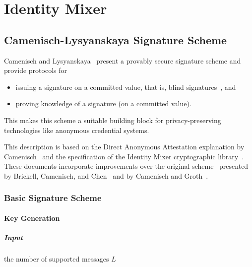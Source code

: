\chapter{Identity Mixer}

\section{Camenisch-Lysyanskaya Signature Scheme}

Camenisch and Lysyanskaya~\cite{CamenischLysyanskaya2002,Lysyanskaya2002}
present a provably secure signature scheme and provide protocols for
\begin{itemize}
  \item issuing a signature on a committed value, that is, blind
    signatures~\cite{Chaum1983}, and
  \item proving knowledge of a signature (on a committed value).
\end{itemize}
This makes this scheme a suitable building block for privacy-preserving
technologies like anonymous credential systems.

This description is based on the Direct Anonymous Attestation explanation by
Camenisch~\cite{Camenisch2007} and the specification of the Identity Mixer
cryptographic library~\cite{Idemix_Crypto2010}. These documents incorporate
improvements over the original scheme~\cite{CamenischLysyanskaya2002} presented
by Brickell, Camenisch, and Chen~\cite{BrickellCC2004} and by Camenisch and
Groth~\cite{CamenischGroth2004}.

\subsection{Basic Signature Scheme}\label{sec:cl_basic}

\subsubsection{Key Generation}\label{sec:cl_basic-keygen}

\paragraph{Input}
  the number of supported messages $L$

